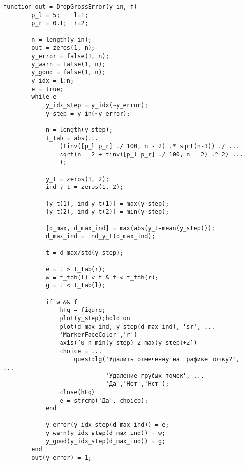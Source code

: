 \begin{lstlisting}[label={list:DropGrossError},caption={Функция отброса грубых ошибок}]
	function out = DropGrossError(y_in, f)
		p_l = 5;    l=1;
		p_r = 0.1;  r=2;
		
		n = length(y_in);
		out = zeros(1, n);
		y_error = false(1, n);
		y_warn = false(1, n);
		y_good = false(1, n);
		y_idx = 1:n;
		e = true;
		while e
			y_idx_step = y_idx(~y_error);
			y_step = y_in(~y_error);
			
			n = length(y_step);
			t_tab = abs(...
				(tinv([p_l p_r] ./ 100, n - 2) .* sqrt(n-1)) ./ ...
				sqrt(n - 2 + tinv([p_l p_r] ./ 100, n - 2) .^ 2) ...
				);
			
			y_t = zeros(1, 2);
			ind_y_t = zeros(1, 2);
			
			[y_t(1), ind_y_t(1)] = max(y_step);
			[y_t(2), ind_y_t(2)] = min(y_step);
			
			[d_max, d_max_ind] = max(abs(y_t-mean(y_step)));    
			d_max_ind = ind_y_t(d_max_ind);
			
			t = d_max/std(y_step);
			
			e = t > t_tab(r);
			w = t_tab(l) < t & t < t_tab(r);
			g = t < t_tab(l);
			
			if w && f
				hFq = figure;
				plot(y_step);hold on
				plot(d_max_ind, y_step(d_max_ind), 'sr', ...
				'MarkerFaceColor','r')
				axis([0 n min(y_step)-2 max(y_step)+2])
				choice = ...
				    questdlg('Удалить отмеченну на графике точку?', ...
				             'Удаление грубых точек', ...
				             'Да','Нет','Нет');
				close(hFq)   
				e = strcmp('Да', choice);
			end
			
			y_error(y_idx_step(d_max_ind)) = e;
			y_warn(y_idx_step(d_max_ind)) = w;
			y_good(y_idx_step(d_max_ind)) = g;    
		end
		out(y_error) = 1;		
\end{lstlisting}